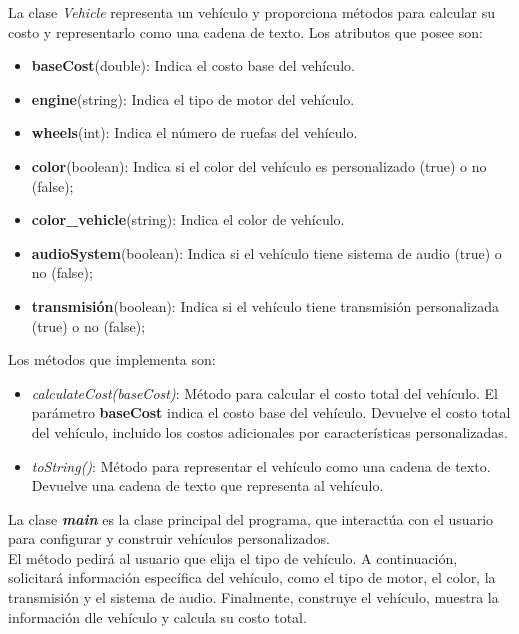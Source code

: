 \documentclass{article} %
\begin{document}
    \hspace*{1cm}La clase \textit{Vehicle} representa un vehículo y proporciona métodos para calcular su costo y representarlo como una cadena de texto.
    Los atributos que posee son:

    \begin{itemize}
        \item \textbf{baseCost}(double): Indica el costo base del vehículo.
        \item \textbf{engine}(string): Indica el tipo de motor del vehículo.
        \item \textbf{wheels}(int): Indica el número de ruefas del vehículo.
        \item \textbf{color}(boolean): Indica si el color del vehículo es personalizado (true) o no (false);
        \item \textbf{color\_vehicle}(string): Indica el color de vehículo.
        \item \textbf{audioSystem}(boolean): Indica si el vehículo tiene sistema de audio (true) o no (false);
        \item \textbf{transmisión}(boolean): Indica si el vehículo tiene transmisión personalizada (true) o no (false);   
    \end{itemize}

    Los métodos que implementa son:

    \begin{itemize}
        \item \textit{calculateCost(baseCost)}: Método para calcular el costo total del vehículo. El parámetro \textbf{baseCost} indica el costo base del vehículo.
                Devuelve el costo total del vehículo, incluido los costos adicionales por características personalizadas.
        \item \textit{toString()}: Método para representar el vehículo como una cadena de texto.
                Devuelve una cadena de texto que representa al vehículo.
    \end{itemize}

    \hspace*{1cm}La clase \textit{\textbf{main}} es la clase principal del programa, que interactúa con el usuario para 
    configurar y construir vehículos personalizados.\\
    
    \hspace*{1cm}El método pedirá al usuario que elija el tipo de vehículo. A continuación, solicitará información específica
    del vehículo, como el tipo de motor, el color, la transmisión y el sistema de audio. Finalmente, construye el vehículo, 
    muestra la información dle vehículo y calcula su costo total.
\end{document}
